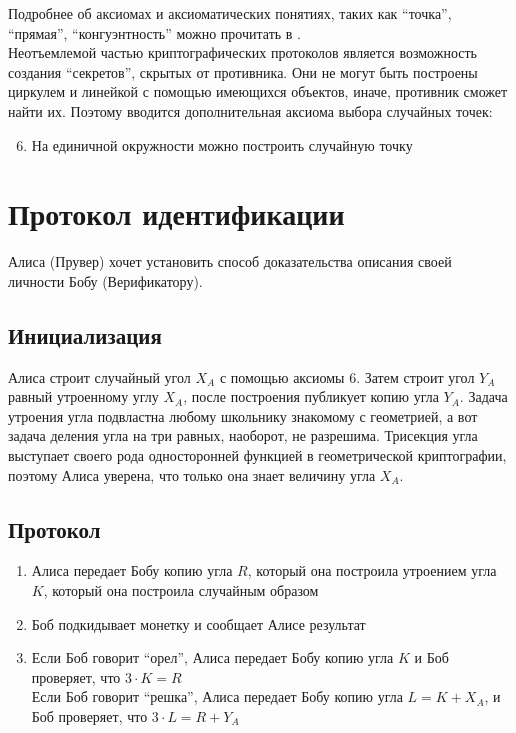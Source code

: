 \documentclass{report}%
\begin{document}
\noindent Подробнее об аксиомах и аксиоматических понятиях,
таких как ``точка'', ``прямая'', ``конгуэнтность'' можно прочитать в \cite{britt}.~\\

\noindent Неотъемлемой частью криптографических протоколов является возможность 
создания ``секретов'', скрытых от противника. Они не могут быть построены циркулем и линейкой
с помощью имеющихся объектов, иначе, противник сможет найти их. Поэтому вводится дополнительная
аксиома выбора случайных точек:
\begin{enumerate}
  \setcounter{enumi}{5}
  \item На единичной окружности можно построить случайную точку
\end{enumerate}

\section{Протокол идентификации}

Алиса (Прувер) хочет установить способ доказательства описания своей личности Бобу (Верификатору).

\subsection{Инициализация}

Алиса строит случайный угол $X_A$ с помощью аксиомы 6. Затем строит угол $Y_A$ равный
утроенному углу $X_A$, после построения публикует копию угла $Y_A$. Задача утроения угла
подвластна любому школьнику знакомому с геометрией, а вот задача деления угла на три равных, наоборот,
не разрешима. Трисекция угла выступает своего рода односторонней функцией в геометрической
криптографии, поэтому Алиса уверена, что только она знает величину угла $X_A$.

\subsection{Протокол}

\begin{enumerate}
	\item Алиса передает Бобу копию угла $R$, который она построила утроением угла $K$, который она
		построила случайным образом
	\item Боб подкидывает монетку и сообщает Алисе результат
	\item Если Боб говорит ``орел'', Алиса передает Бобу копию угла $K$ и Боб проверяет,
		что $3 \cdot K = R$~\\
		Если Боб говорит ``решка'', Алиса передает Бобу копию угла $L = K + X_A$, и Боб
		проверяет, что $3 \cdot L = R + Y_A$
\end{enumerate}
\end{document}
